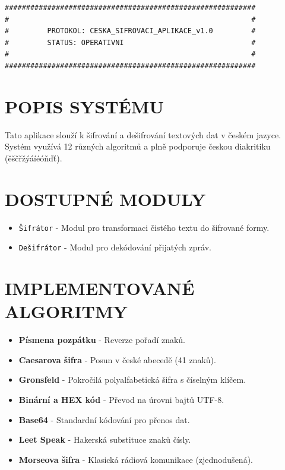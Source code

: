 \documentclass[12pt]{article}
\begin{document}
\large

\begin{center}
\begin{Verbatim}[formatcom=\color{text_zelena}, fontsize=\Large]
###########################################################
#                                                         #
#         PROTOKOL: CESKA_SIFROVACI_APLIKACE_v1.0         #
#         STATUS: OPERATIVNI                              #
#                                                         #
###########################################################
\end{Verbatim}
\end{center}

\vspace{1cm}

\section{POPIS SYSTÉMU}
Tato aplikace slouží k šifrování a dešifrování textových dat v českém jazyce. Systém využívá 12 různých algoritmů a plně podporuje českou diakritiku (ěščřžýáíéóňďť).

\section{DOSTUPNÉ MODULY}
\begin{itemize}
    \item \texttt{Šifrátor} - Modul pro transformaci čistého textu do šifrované formy.
    \item \texttt{Dešifrátor} - Modul pro dekódování přijatých zpráv.
\end{itemize}

\section{IMPLEMENTOVANÉ ALGORITMY}
\begin{itemize}
    \item \textbf{Písmena pozpátku} - Reverze pořadí znaků.
    \item \textbf{Caesarova šifra} - Posun v české abecedě (41 znaků).
    \item \textbf{Gronsfeld} - Pokročilá polyalfabetická šifra s číselným klíčem.
    \item \textbf{Binární a HEX kód} - Převod na úrovni bajtů UTF-8.
    \item \textbf{Base64} - Standardní kódování pro přenos dat.
    \item \textbf{Leet Speak} - Hakerská substituce znaků čísly.
    \item \textbf{Morseova šifra} - Klasická rádiová komunikace (zjednodušená).
\end{itemize}
\end{document}
